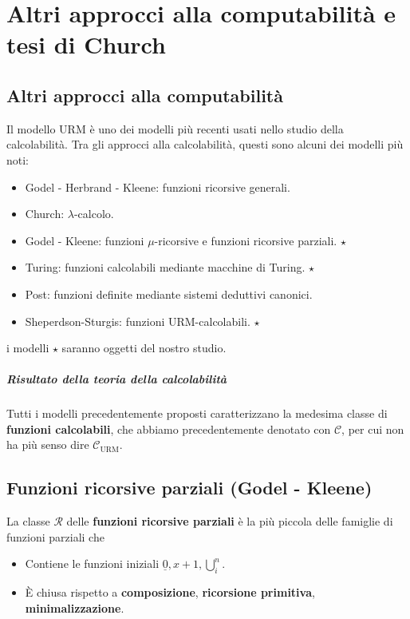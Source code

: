 	\chapter{Altri approcci alla computabilità e tesi di Church}
	
	\section{Altri approcci alla computabilità}
	
	Il modello URM è uno dei modelli più recenti usati nello studio della calcolabilità. Tra gli approcci alla calcolabilità, questi sono alcuni dei modelli più noti:
	\begin{itemize}
		\item Godel - Herbrand - Kleene: funzioni ricorsive generali.
		\item Church: $\lambda$-calcolo.
		\item Godel - Kleene: funzioni $\mu$-ricorsive e funzioni ricorsive parziali. $\star$
		\item Turing: funzioni calcolabili mediante macchine di Turing. $\star$
		\item Post: funzioni definite mediante sistemi deduttivi canonici.
		\item Sheperdson-Sturgis: funzioni URM-calcolabili. $\star$
	\end{itemize}
	
	i modelli $\star$ saranno oggetti del nostro studio.
	
	\paragraph{Risultato della teoria della calcolabilità} Tutti i modelli precedentemente proposti caratterizzano la medesima classe di \textbf{funzioni calcolabili}, che abbiamo precedentemente denotato con $\mathcal{C}$, per cui non ha più senso dire $\mathcal{C}_\text{URM}$.
	
	\section{Funzioni ricorsive parziali (Godel - Kleene)}
	La classe $\mathcal{R}$ delle \textbf{funzioni ricorsive parziali} è la più piccola delle famiglie di funzioni parziali che
	\begin{itemize}
		\item Contiene le funzioni iniziali $\underline 0, x+1, \bigcup_{i}^n$.
		\item È chiusa rispetto a \textbf{composizione}, \textbf{ricorsione primitiva}, \textbf{minimalizzazione}.
	\end{itemize}
	
